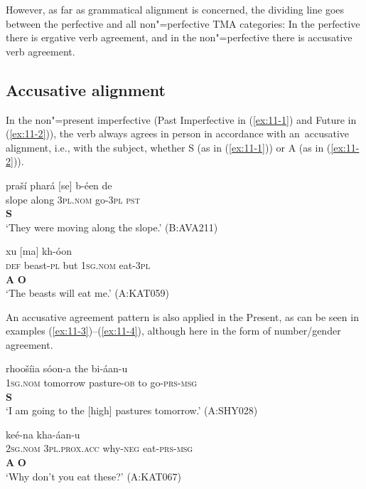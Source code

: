 However, as far as grammatical alignment is concerned, the dividing line goes between the perfective and all non"=perfective TMA categories: In the perfective there is ergative verb agreement, and in the non"=perfective there is accusative verb agreement. 


\subsection{Accusative alignment}
\label{subsec:11-1-1}


In the non"=present imperfective (Past Imperfective in (\ref{ex:11-1}) and Future in (\ref{ex:11-2})), the verb always agrees in person in accordance with an~accusative alignment, i.e., with the subject, whether S (as in (\ref{ex:11-1})) or A (as in (\ref{ex:11-2})). 

\begin{exe}
\ex
\label{ex:11-1}
\glll praší phará [se] b-éen de \\
slope along \textsc{3pl.nom} go-\textsc{3pl} \textsc{pst} \\
{} {}  \textbf{S} \\
\glt `They were moving along the slope.' (B:AVA211)

\ex
\label{ex:11-2}
 xu [ma] kh-óon \\
\textsc{def} beast-\textsc{pl} but \textsc{1sg.nom} eat-\textsc{3pl} \\
 \textbf{A} {} {}  \textbf{O} \\
\glt `The beasts will eat me.' (A:KAT059)
\end{exe}

An accusative agreement pattern is also applied in the Present, as can be seen in examples (\ref{ex:11-3})--(\ref{ex:11-4}), although here in the form of number/gender agreement.

\begin{exe}
\ex
\label{ex:11-3}
\glll [ma] rhoošíia sóon-a the bi-áan-u \\
\textsc{1sg.nom} tomorrow pasture-\textsc{ob} to go-\textsc{prs-}\textsc{msg} \\
\textbf{S} \\
\glt `I am going to the [high] pastures tomorrow.' (A:SHY028)

\ex
\label{ex:11-4}
\glll [tu] [aniaám] keé-na kha-áan-u \\
\textsc{2sg.nom} \textsc{3pl.prox.acc} why-\textsc{neg} eat-\textsc{prs-}\textsc{msg} \\
\textbf{A} \textbf{O} \\
\glt `Why don't you eat these?' (A:KAT067)
\end{exe}


